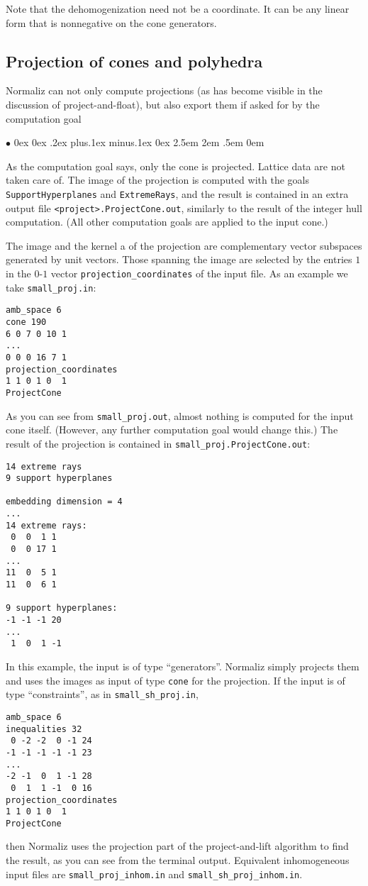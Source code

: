 \documentclass[12pt,a4paper]{scrartcl}
\newcommand{\stdli}{ \topsep0ex \partopsep0ex %
\parsep.2ex plus.1ex minus.1ex \itemsep0ex%
\leftmargin2.5em \labelwidth2em \labelsep.5em \rightmargin0em}%
\renewenvironment{itemize}{\begin{list}{{$\bullet$}}{\stdli}}{\end{list}}
\theoremstyle{definition}
\def\itemtt[#1]{\item[\textbf{\ttt{#1}}]}
\def\ttt{\texttt}
\begin{document}
Note that the dehomogenization need not be a coordinate. It can be any linear form that is nonnegative on the cone generators.

\subsection{Projection of cones and polyhedra}\label{Proj_cone}

Normaliz can not only compute projections (as has become visible in the discussion of project-and-float), but also export them if asked for by the computation goal
\begin{itemize}
	\itemtt[ProjectCone]
\end{itemize}
As the computation goal says, only the cone is projected. Lattice data are not taken care of. The image of the projection is computed with the goals \verb|SupportHyperplanes| and \verb|ExtremeRays|, and the result is contained in an extra output file \verb|<project>.ProjectCone.out|, similarly to the result of the integer hull computation. (All other computation goals are applied to the input cone.)

The image and the kernel a of the projection are complementary vector subspaces generated by unit vectors. Those spanning the image are selected by the entries $1$ in the $0$-$1$ vector \verb|projection_coordinates| of the input file. As an example we take
\verb|small_proj.in|:
\begin{Verbatim}
amb_space 6
cone 190
6 0 7 0 10 1
...
0 0 0 16 7 1
projection_coordinates
1 1 0 1 0  1
ProjectCone
\end{Verbatim}
As you can see from \verb|small_proj.out|, almost nothing is computed for the input cone itself. (However, any further computation goal would change this.) The result of the projection is contained in \verb|small_proj.ProjectCone.out|:
\begin{Verbatim}
14 extreme rays
9 support hyperplanes

embedding dimension = 4
...
14 extreme rays:
 0  0  1 1
 0  0 17 1
...
11  0  5 1
11  0  6 1

9 support hyperplanes:
-1 -1 -1 20
...
 1  0  1 -1
\end{Verbatim}
In this example, the input is of type ``generators''. Normaliz simply projects them and uses the images as input of type \verb|cone| for the projection. If the input is of type ``constraints'', as in \verb|small_sh_proj.in|,
\begin{Verbatim}
amb_space 6
inequalities 32
 0 -2 -2  0 -1 24
-1 -1 -1 -1 -1 23
...
-2 -1  0  1 -1 28
 0  1  1 -1  0 16
projection_coordinates
1 1 0 1 0  1
ProjectCone
\end{Verbatim}
then Normaliz uses the projection part of the project-and-lift algorithm to find the result, as you can see from the terminal output. Equivalent inhomogeneous input files are \verb|small_proj_inhom.in| and \verb|small_sh_proj_inhom.in|.
\end{document}
